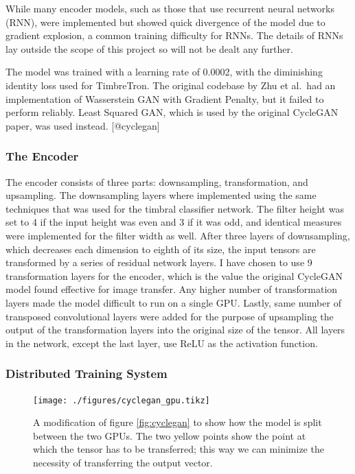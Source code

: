 \documentclass[12pt,a4paper,]{report}
\begin{document}
While many encoder models, such as those that use recurrent neural
networks (RNN), were implemented but showed quick divergence of the
model due to gradient explosion, a common training difficulty for RNNs.
The details of RNNs lay outside the scope of this project so will not be
dealt any further.

The model was trained with a learning rate of 0.0002, with the
diminishing identity loss used for TimbreTron. The original codebase by
Zhu et al.~had an implementation of Wasserstein GAN with Gradient
Penalty, but it failed to perform reliably. Least Squared GAN, which is
used by the original CycleGAN paper, was used instead. {[}@cyclegan{]}

\hypertarget{the-encoder}{%
\subsubsection{The Encoder}\label{the-encoder}}

The encoder consists of three parts: downsampling, transformation, and
upsampling. The downsampling layers where implemented using the same
techniques that was used for the timbral classifier network. The filter
height was set to 4 if the input height was even and 3 if it was odd,
and identical measures were implemented for the filter width as well.
After three layers of downsampling, which decreases each dimension to
eighth of its size, the input tensors are transformed by a series of
residual network layers. I have chosen to use 9 transformation layers
for the encoder, which is the value the original CycleGAN model found
effective for image transfer. Any higher number of transformation layers
made the model difficult to run on a single GPU. Lastly, same number of
transposed convolutional layers were added for the purpose of upsampling
the output of the transformation layers into the original size of the
tensor. All layers in the network, except the last layer, use ReLU as
the activation function.

\hypertarget{distributed-training-system}{%
\subsubsection{Distributed Training
System}\label{distributed-training-system}}

\begin{figure}[h]
    \texttt{[image: ./figures/cyclegan\_gpu.tikz]}
    \centering
    \caption{A modification of figure \ref{fig:cyclegan} to show how the model is split between the two GPUs. The two yellow points show the point at which the tensor has to be transferred; this way we can minimize the necessity of transferring the output vector.} \label{fig:cyclegan_gpu}
\end{figure}
\end{document}
